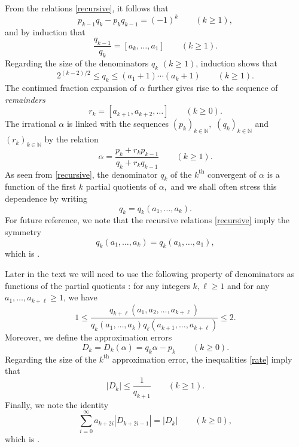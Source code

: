 \documentclass[12pt, reqno]{amsart}
\theoremstyle{definition}
\theoremstyle{remark}
\numberwithin{equation}{section}
\def\alp{{\alpha}} \def\bfalp{{\boldsymbol \alpha}}
\def\ls{\leqslant} \def\gs{\geqslant}
\def\geq{\geqslant}
\def \bN {\mathbb N}
\begin{document}
	From the relations \eqref{recursive}, it follows that
	\begin{equation} \label{pkqk}
		p_{k-1}q_k - p_k q_{k-1} = (-1)^{k} \qquad (k\gs 1),
	\end{equation}
	and by induction that
	\begin{equation} \label{cf_inverse}
		\frac{q_{k-1}}{q_k}=[a_k,\dots,a_1] \qquad (k\gs 1).
	\end{equation}
	Regarding the size of the denominators $q_k \,\,  (k\gs 1)$, induction shows that 
	\begin{equation} \label{q_k_size}
		2^{(k-2)/2} \ls q_k \ls (a_1 + 1)\cdots (a_k +1)  \qquad (k\gs 1).    
	\end{equation}
	The continued fraction expansion of $\alpha$ further gives rise to the sequence of {\it remainders} 
	\begin{equation} \label{rk_def}
		r_k = [a_{k+1}, a_{k+2}, \dots] \qquad (k\gs 0).  
	\end{equation} 
	The irrational $\alp$ is linked with the sequences  $(p_k)_{k\in\bN},$ $(q_k)_{k\in\bN}$ and $(r_k)_{k\in\bN}$ by the relation
	\begin{equation} \label{relation_remainders}
		\alp = \frac{p_k + r_{k}p_{k-1}}{q_k + r_{k}q_{k-1}} \qquad (k\geq 1).
	\end{equation}
	As seen from \eqref{recursive}, the denominator $q_k$ of the $k^{\mathrm{th}}$ convergent of $\alp$ is a function of the first $k$ partial quotients of $\alpha,$ and we shall often stress this dependence by writing 
	\[ 
	q_k = q_k(a_1,\ldots,a_k).
	\]
	For future reference, we note that the recursive relations \eqref{recursive} imply the symmetry
	\begin{equation} \label{q_k_inverse}
		q_k(a_1,\ldots,a_k)=q_k(a_k,\ldots,a_1),
	\end{equation}
	which is \cite[Equation (2)]{QR2003}.
	
	Later in the text we will need to use the following property of denominators as functions of the partial quotients \cite[Equation (6)]{QR2003}: for any integers $k,\ell \gs 1$ and for any $a_1,\ldots, a_{k+\ell} \gs 1$, we have 
	\begin{equation} \label{concatenation}
		1 \ls \frac{q_{k+\ell}(a_1, a_2, \ldots, a_{k+\ell})}{q_{k}(a_1,\ldots,a_k) q_{\ell}(a_{k+1},\ldots,a_{k+\ell})} \ls 2.
	\end{equation}  
	Moreover, we define the approximation errors
	\[
	D_k = D_k(\alp) = q_k \alp - p_k
	\qquad (k \ge 0).
	\]
	Regarding the size of the $k^{\mathrm{th}}$ approximation error, the inequalities \eqref{rate} imply that  
	\begin{equation} \label{Dk_size}
		|D_k| \ls   \frac{1}{q_{k+1}}  \qquad (k\gs 1).  
	\end{equation}
	Finally, we note the identity
	\begin{equation} \label{EndpointIdentity}
		\sum_{i=0}^\infty a_{k+2i} |D_{k+2i-1}| = |D_k| \qquad (k \ge 0),
	\end{equation}
	which is \cite[Equation (3.7)]{BHV}.
	
\end{document}
